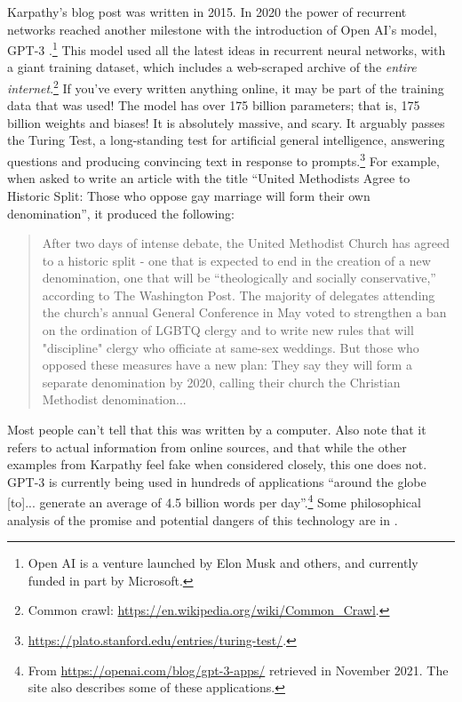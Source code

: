 Karpathy's blog post was written in 2015. In 2020 the power of recurrent networks reached another milestone with the introduction of Open AI's model, GPT-3 \cite{brown2020language, floridi2020gpt}.\footnote{Open AI is a venture launched by Elon Musk and others, and currently funded in part by Microsoft.} This model used all the latest ideas in recurrent neural networks, with a giant training dataset, which includes a web-scraped archive of the \emph{entire internet}.\footnote{Common crawl: \url{https://en.wikipedia.org/wiki/Common_Crawl}.} If you've every written anything online, it may be part of the training data that was used! The model has over 175 billion parameters; that is, 175 billion weights and biases! It is absolutely massive, and scary. It arguably passes the Turing Test, a long-standing test for artificial general intelligence, answering questions and producing convincing  text in response to prompts.\footnote{\url{https://plato.stanford.edu/entries/turing-test/}.} For example, when asked to write an article with the title ``United Methodists Agree to Historic Split: Those who oppose gay marriage will form their own denomination'', it produced the following:
\begin{quote}
After two days of intense debate, the United Methodist Church has agreed to a historic split - one that is expected to end in the creation of a new denomination, one that will be ``theologically and socially conservative,'' according to The Washington Post. The majority of delegates attending the church's annual General Conference in May voted to strengthen a ban on the ordination of LGBTQ clergy and to write new rules that will "discipline" clergy who officiate at same-sex weddings. But those who opposed these measures have a new plan: They say they will form a separate denomination by 2020, calling their church the Christian Methodist denomination...
\end{quote}
Most people can't tell that this was written by a computer. Also note that it refers to actual information from online sources,  and that while the other examples from Karpathy feel fake when considered closely, this one does not. GPT-3 is currently being used in hundreds of applications ``around the globe [to]... generate an average of 4.5 billion words per day''.\footnote{From \url{https://openai.com/blog/gpt-3-apps/} retrieved in November 2021. The site also describes some of these applications.} Some philosophical analysis of the promise and potential dangers of this technology are in \cite{floridi2020gpt}.

